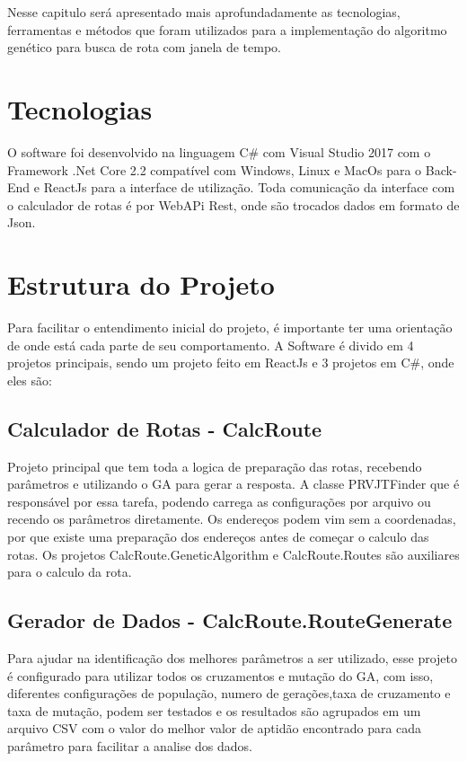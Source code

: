 Nesse capitulo será apresentado mais aprofundadamente as tecnologias, ferramentas e métodos que foram utilizados para a implementação do algoritmo genético para busca de rota com janela de tempo.

\section{Tecnologias}

O software foi desenvolvido na linguagem C\# com Visual Studio 2017 com o Framework  .Net Core 2.2 compatível com Windows, Linux e MacOs para o Back-End e ReactJs para a interface de utilização.
Toda comunicação da interface com o calculador de rotas é por WebAPi Rest, onde são trocados dados em formato de Json.

\section{Estrutura do Projeto}

Para facilitar o entendimento inicial do projeto, é importante ter uma orientação de onde está cada parte de seu comportamento. A Software é divido em 4 projetos principais, sendo um projeto feito em ReactJs e 3  projetos em C\#, onde eles são:

\subsection{Calculador de Rotas - CalcRoute}

Projeto principal que tem toda a logica de preparação das rotas, recebendo parâmetros e utilizando o GA para gerar a resposta.
A classe PRVJTFinder que é responsável por essa tarefa, podendo carrega as configurações por arquivo ou recendo os parâmetros diretamente. Os endereços podem vim sem a coordenadas, por que existe uma preparação dos endereços antes de começar o calculo das rotas. Os projetos CalcRoute.GeneticAlgorithm e CalcRoute.Routes são auxiliares para o calculo da rota.

\subsection{Gerador de Dados - CalcRoute.RouteGenerate}

Para ajudar na identificação dos melhores parâmetros a ser utilizado, esse projeto é configurado para utilizar todos os cruzamentos e mutação do GA, com isso, diferentes configurações de população, numero de gerações,taxa de cruzamento e taxa de mutação, podem ser testados e os resultados são agrupados em um arquivo CSV com o valor do melhor valor de aptidão encontrado para cada parâmetro para facilitar a analise dos dados.

